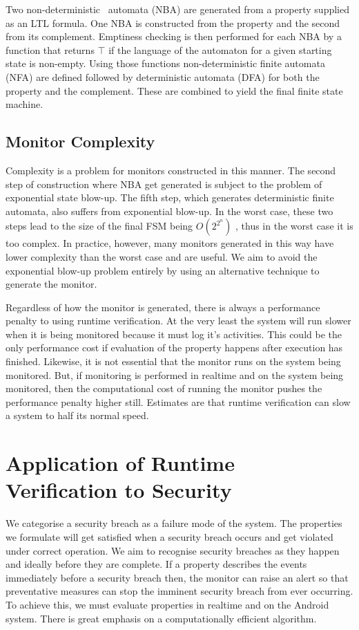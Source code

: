 Two non-deterministic \Buchi\ automata (NBA) are generated from a property supplied as an LTL formula.  One NBA is constructed from the property and the second from its complement.  Emptiness checking is then performed for each NBA by a function that returns $\top$ if the language of the automaton for a given starting state is non-empty.  Using those functions non-deterministic finite automata (NFA) are defined followed by deterministic automata (DFA) for both the property and the complement.  These are combined to yield the final finite state machine.

\subsection{Monitor Complexity}

Complexity is a problem for monitors constructed in this manner.  The second step of construction where NBA get generated is subject to the problem of exponential state blow-up.  The fifth step, which generates deterministic finite automata, also suffers from exponential blow-up.  In the worst case, these two steps lead to the size of the final FSM being $O(2^{2^n})$ \cite{RVForLTLAndTLTL}, thus in the worst case it is too complex.  In practice, however, many monitors generated in this way have lower complexity than the worst case and are useful.  We aim to avoid the exponential blow-up problem entirely by using an alternative technique to generate the monitor.

Regardless of how the monitor is generated, there is always a performance penalty to using runtime verification.  At the very least the system will run slower when it is being monitored because it must log it's activities.  This could be the only performance cost if evaluation of the property happens after execution has finished.  Likewise, it is not essential that the monitor runs on the system being monitored.  But, if monitoring is performed in realtime and on the system being monitored, then the computational cost of running the monitor pushes the performance penalty higher still.  Estimates are that runtime verification can slow a system to half its normal speed.%

\section{Application of Runtime Verification to Security}

We categorise a security breach as a failure mode of the system.  The properties we formulate will get satisfied when a security breach occurs and get violated under correct operation.  We aim to recognise security breaches as they happen and ideally before they are complete.  If a property describes the events immediately before a security breach then, the monitor can raise an alert so that preventative measures can stop the imminent security breach from ever occurring.  To achieve this, we must evaluate properties in realtime and on the Android system.  There is great emphasis on a computationally efficient algorithm.

